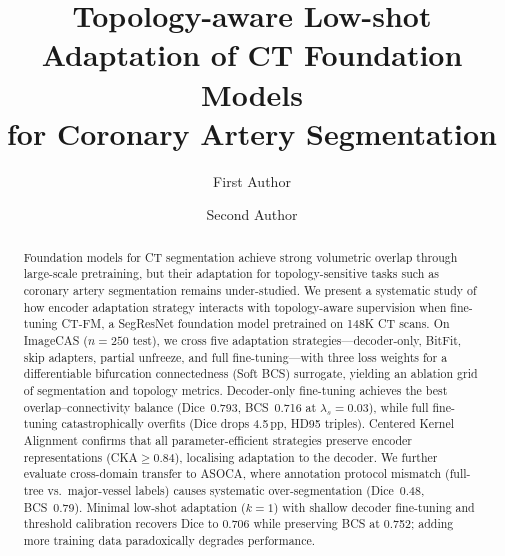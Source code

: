 \documentclass[runningheads]{llncs}
\begin{document}
\title{Topology-aware Low-shot Adaptation of CT Foundation Models\\for Coronary Artery Segmentation}

\author{First Author \and
Second Author}
%
%

\maketitle

\begin{abstract}
Foundation models for CT segmentation achieve strong volumetric overlap through large-scale pretraining, but their adaptation for topology-sensitive tasks such as coronary artery segmentation remains under-studied.
We present a systematic study of how encoder adaptation strategy interacts with topology-aware supervision when fine-tuning CT-FM, a SegResNet foundation model pretrained on 148K CT scans.
On ImageCAS ($n{=}250$ test), we cross five adaptation strategies---decoder-only, BitFit, skip adapters, partial unfreeze, and full fine-tuning---with three loss weights for a differentiable bifurcation connectedness (Soft BCS) surrogate, yielding an ablation grid of segmentation and topology metrics.
Decoder-only fine-tuning achieves the best overlap--connectivity balance (Dice~0.793, BCS~0.716 at $\lambda_s{=}0.03$), while full fine-tuning catastrophically overfits (Dice drops 4.5\,pp, HD95 triples).
Centered Kernel Alignment confirms that all parameter-efficient strategies preserve encoder representations (CKA${\geq}0.84$), localising adaptation to the decoder.
We further evaluate cross-domain transfer to ASOCA, where annotation protocol mismatch (full-tree vs.\ major-vessel labels) causes systematic over-segmentation (Dice~0.48, BCS~0.79).
Minimal low-shot adaptation ($k{=}1$) with shallow decoder fine-tuning and threshold calibration recovers Dice to 0.706 while preserving BCS at 0.752; adding more training data paradoxically degrades performance.
\end{abstract}
\end{document}
